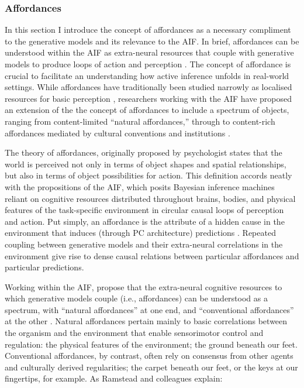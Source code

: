 \begin{CJK}{UTF8}{gbsn}
\subsubsection{Affordances}
In this section I introduce the concept of affordances as a necessary compliment to the generative models and its relevance to the AIF.  In brief, affordances can be understood within the AIF as extra-neural resources that couple with generative models to produce loops of action and perception \citep{Ramstead2016,Clark2015}.  The concept of affordance is crucial to facilitate an understanding how active inference unfolds in real-world settings.  While affordances have traditionally been studied narrowly as localised resources for basic perception \citep[e.g.][]{Fajen2011}, researchers working with the AIF have proposed an extension of the the concept of affordances to include a spectrum of objects, ranging from content-limited ``natural affordances,'' through to content-rich affordances mediated by cultural conventions and institutions \citep[cf.][]{Roepstorff2010,Ramstead2016}.

The theory of affordances, originally proposed by psychologist \textcite{Gibson1979} states that the world is perceived not only in terms of object shapes and spatial relationships, but also in terms of object possibilities for action.  This definition accords neatly with the propositions of the AIF, which posits Bayesian inference machines reliant on cognitive resources distributed throughout brains, bodies, and physical features of the task-specific environment in circular causal loops of perception and action.  Put simply, an affordance is the attribute of a hidden cause in the environment that induces (through PC architecture) predictions \citep[908]{Pezzulo2013}.  Repeated coupling between generative models and their extra-neural correlations in the environment give rise to dense causal relations between particular affordances and particular predictions.

Working within the AIF, \textcite[7]{Ramstead2016} propose that the extra-neural cognitive resources to which generative models couple (i.e., affordances) can be understood as a spectrum, with ``natural affordances'' at one end, and ``conventional affordances'' at the other \citep{Ramstead2016}.  Natural affordances pertain mainly to basic correlations between the organism and the environment that enable sensorimotor control and regulation: the physical features of the environment; the ground beneath our feet.  Conventional affordances, by contrast, often rely on consensus from other agents and culturally derived regularities; the carpet beneath our feet, or the keys at our fingertips, for example.  As Ramstead and colleagues explain:


\end{CJK}
